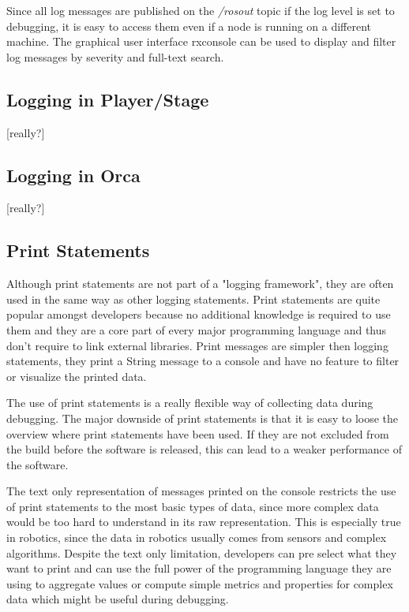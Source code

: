 Since all log messages are published on the \emph{/rosout} topic if the log level is set to debugging, it is easy to access them even if a node is running on a different machine. The graphical user interface rxconsole can be used to display and filter log messages by severity and full-text search.

\subsection{Logging in Player/Stage}
[really?]

\subsection{Logging in Orca}
[really?]


\subsection{Print Statements}
Although print statements are not part of a "logging framework", they are often used in the same way as other logging statements. Print statements are quite popular amongst developers because no additional knowledge is required to use them and they are a core part of every major programming language and thus don't require to link external libraries. Print messages are simpler then logging statements, they print a String message to a console and have no feature to filter or visualize the printed data.

The use of print statements is a really flexible way of collecting data during debugging. The major downside of print statements is that it is easy to loose the overview where print statements have been used. If they are not excluded from the build before the software is released, this can lead to a weaker performance of the software.

The text only representation of messages printed on the console restricts the use of print statements to the most basic types of data, since more complex data would be too hard to understand in its raw representation. This is especially true in robotics, since the data in robotics usually comes from sensors and complex algorithms. Despite the text only limitation, developers can pre select what they want to print and can use the full power of the programming language they are using to aggregate values or compute simple metrics and properties for complex data which might be useful during debugging.


